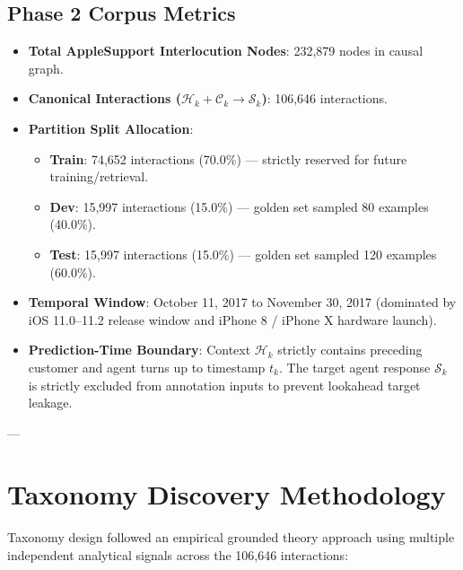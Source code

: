 \documentclass[11pt,a4paper]{article}
\begin{document}
\subsection{Phase 2 Corpus Metrics}
\begin{itemize}[leftmargin=*]
    \item \textbf{Total AppleSupport Interlocution Nodes}: 232,879 nodes in causal graph.
    \item \textbf{Canonical Interactions ($\mathcal{H}_k + \mathcal{C}_k \rightarrow \mathcal{S}_k$)}: 106,646 interactions.
    \item \textbf{Partition Split Allocation}:
    \begin{itemize}
        \item \textbf{Train}: 74,652 interactions (70.0\%) --- strictly reserved for future training/retrieval.
        \item \textbf{Dev}: 15,997 interactions (15.0\%) --- golden set sampled 80 examples (40.0\%).
        \item \textbf{Test}: 15,997 interactions (15.0\%) --- golden set sampled 120 examples (60.0\%).
    \end{itemize}
    \item \textbf{Temporal Window}: October 11, 2017 to November 30, 2017 (dominated by iOS 11.0--11.2 release window and iPhone 8 / iPhone X hardware launch).
    \item \textbf{Prediction-Time Boundary}: Context $\mathcal{H}_k$ strictly contains preceding customer and agent turns up to timestamp $t_k$. The target agent response $\mathcal{S}_k$ is strictly excluded from annotation inputs to prevent lookahead target leakage.
\end{itemize}

---

\section{Taxonomy Discovery Methodology}

Taxonomy design followed an empirical grounded theory approach using multiple independent analytical signals across the 106,646 interactions:
\end{document}
